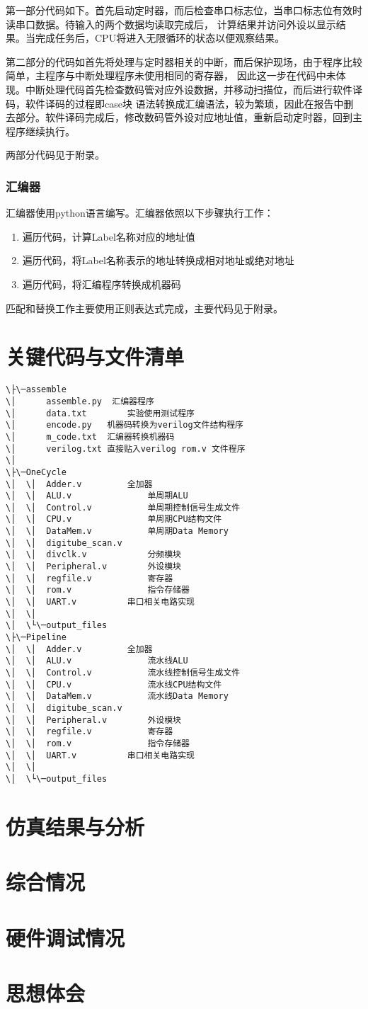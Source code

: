\documentclass{ctexart}
\begin{document}
			第一部分代码如下。首先启动定时器，而后检查串口标志位，当串口标志位有效时读串口数据。待输入的两个数据均读取完成后，
			计算结果并访问外设以显示结果。当完成任务后，CPU将进入无限循环的状态以便观察结果。

			第二部分的代码如首先将处理与定时器相关的中断，而后保护现场，由于程序比较简单，主程序与中断处理程序未使用相同的寄存器，
			因此这一步在代码中未体现。中断处理代码首先检查数码管对应外设数据，并移动扫描位，而后进行软件译码，软件译码的过程即case块
			语法转换成汇编语法，较为繁琐，因此在报告中删去部分。软件译码完成后，修改数码管外设对应地址值，重新启动定时器，回到主程序继续执行。

			两部分代码见于附录。


		\subsubsection{汇编器}
			汇编器使用python语言编写。汇编器依照以下步骤执行工作：
			\begin{enumerate}
				\item 遍历代码，计算Label名称对应的地址值
				\item 遍历代码，将Label名称表示的地址转换成相对地址或绝对地址
				\item 遍历代码，将汇编程序转换成机器码
			\end{enumerate}
			匹配和替换工作主要使用正则表达式完成，主要代码见于附录。

	\section{关键代码与文件清单}
\begin{verbatim}
\├\─assemble
\│      assemble.py  汇编器程序
\│      data.txt		实验使用测试程序
\│      encode.py	机器码转换为verilog文件结构程序
\│      m_code.txt	汇编器转换机器码
\│      verilog.txt	直接贴入verilog rom.v 文件程序
\│
\├\─OneCycle
\│  \│  Adder.v			全加器
\│  \│  ALU.v				单周期ALU
\│  \│  Control.v			单周期控制信号生成文件
\│  \│  CPU.v				单周期CPU结构文件
\│  \│  DataMem.v			单周期Data Memory
\│  \│  digitube_scan.v	
\│  \│  divclk.v			分频模块
\│  \│  Peripheral.v		外设模块
\│  \│  regfile.v			寄存器
\│  \│  rom.v				指令存储器
\│  \│  UART.v			串口相关电路实现
\│  \│
\│  \└\─output_files
\├\─Pipeline
\│  \│  Adder.v			全加器
\│  \│  ALU.v				流水线ALU
\│  \│  Control.v			流水线控制信号生成文件
\│  \│  CPU.v				流水线CPU结构文件
\│  \│  DataMem.v			流水线Data Memory
\│  \│  digitube_scan.v	
\│  \│  Peripheral.v		外设模块
\│  \│  regfile.v			寄存器
\│  \│  rom.v				指令存储器
\│  \│  UART.v			串口相关电路实现
\│  \│
\│  \└\─output_files
\end{verbatim}
	\section{仿真结果与分析}
	\section{综合情况}
	\section{硬件调试情况}
	\section{思想体会}
\end{document}
